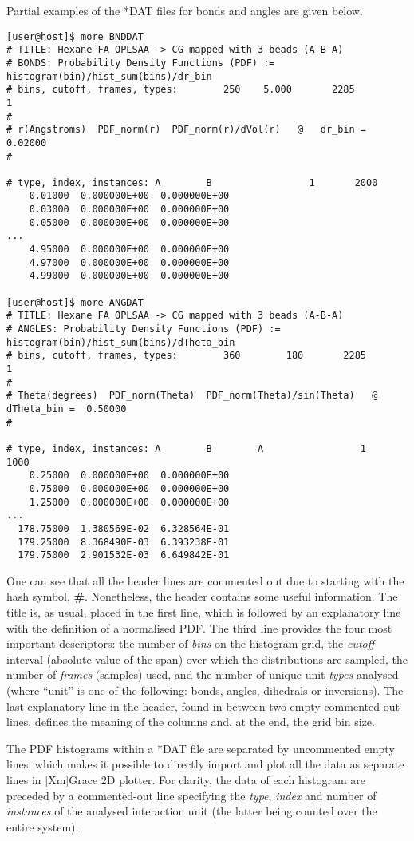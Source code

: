 Partial examples of the *DAT files for bonds and angles are given below.

\begin{verbatim}
[user@host]$ more BNDDAT
# TITLE: Hexane FA OPLSAA -> CG mapped with 3 beads (A-B-A)
# BONDS: Probability Density Functions (PDF) := histogram(bin)/hist_sum(bins)/dr_bin
# bins, cutoff, frames, types:        250    5.000       2285          1
#
# r(Angstroms)  PDF_norm(r)  PDF_norm(r)/dVol(r)   @   dr_bin =  0.02000
#

# type, index, instances: A        B                 1       2000
    0.01000  0.000000E+00  0.000000E+00
    0.03000  0.000000E+00  0.000000E+00
    0.05000  0.000000E+00  0.000000E+00
...
    4.95000  0.000000E+00  0.000000E+00
    4.97000  0.000000E+00  0.000000E+00
    4.99000  0.000000E+00  0.000000E+00

[user@host]$ more ANGDAT
# TITLE: Hexane FA OPLSAA -> CG mapped with 3 beads (A-B-A)
# ANGLES: Probability Density Functions (PDF) := histogram(bin)/hist_sum(bins)/dTheta_bin
# bins, cutoff, frames, types:        360        180       2285          1
#
# Theta(degrees)  PDF_norm(Theta)  PDF_norm(Theta)/sin(Theta)   @   dTheta_bin =  0.50000
#

# type, index, instances: A        B        A                 1       1000
    0.25000  0.000000E+00  0.000000E+00
    0.75000  0.000000E+00  0.000000E+00
    1.25000  0.000000E+00  0.000000E+00
...
  178.75000  1.380569E-02  6.328564E-01
  179.25000  8.368490E-03  6.393238E-01
  179.75000  2.901532E-03  6.649842E-01
\end{verbatim}

One can see that all the header lines are commented out due
to starting with the hash symbol, {\bf \#}.  Nonetheless, the
header contains some useful information.  The title is, as usual,
placed in the first line, which is followed by an explanatory
line with the definition of a normalised PDF.
The third line provides the four most important descriptors:
the number of {\em bins} on the histogram grid, the {\em cutoff}
interval (absolute value of the span) over which the distributions
are sampled, the number of {\em frames} (samples) used, and
the number of unique unit {\em types} analysed (where ``unit''
is one of the following: bonds, angles, dihedrals or inversions).
The last explanatory line in the header, found in between
two empty commented-out lines, defines the meaning of
the columns and, at the end, the grid bin size.

The PDF histograms within a *DAT file are separated by uncommented
empty lines, which makes it possible to directly import and plot
all the data as separate lines in [Xm]Grace 2D plotter.  For clarity,
the data of each histogram are preceded by a commented-out line
specifying the {\em type}, {\em index} and number of {\em instances}
of the analysed interaction unit (the latter being counted over
the entire system).

